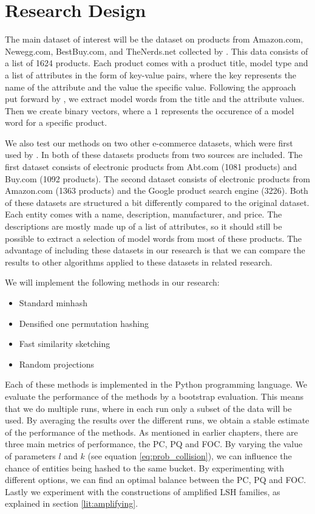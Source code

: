 \chapter{Research Design}
The main dataset of interest will be the dataset on products from Amazon.com, Newegg.com, BestBuy.com, and TheNerds.net collected by \cite{DamGKNVF16}. This data consists of a list of 1624 products. Each product comes with a product title, model type and a list of attributes in the form of key-value pairs, where the key represents the name of the attribute and the value the specific value. Following the approach put forward by \cite{HartveldKMNPFS18}, we extract model words from the title and the attribute values. Then we create binary vectors, where a $1$ represents the occurence of a model word for a specific product.

We also test our methods on two other e-commerce datasets, which were first used by \cite{KopckeTR10}. In both of these datasets products from two sources are included. The first dataset consists of electronic products from Abt.com (1081 products) and Buy.com (1092 products). The second dataset consists of electronic products from Amazon.com (1363 products) and the Google product search engine (3226). Both of these datasets are structured a bit differently compared to the original dataset. Each entity comes with a name, description, manufacturer, and price. The descriptions are mostly made up of a list of attributes, so it should still be possible to extract a selection of model words from most of these products. The advantage of including these datasets in our research is that we can compare the results to other algorithms applied to these datasets in related research.

We will implement the following methods in our research:
\begin{itemize}
\item Standard minhash
\item Densified one permutation hashing
\item Fast similarity sketching
\item Random projections
\end{itemize}
Each of these methods is implemented in the Python programming language. We evaluate the performance of the methods by a bootstrap evaluation. This means that we do multiple runs, where in each run only a subset of the data will be used. By averaging the results over the different runs, we obtain a stable estimate of the performance of the methods. As mentioned in earlier chapters, there are three main metrics of performance, the PC, PQ and FOC. By varying the value of parameters $l$ and $k$ (see equation \ref{eq:prob_collision}), we can influence the chance of entities being hashed to the same bucket. By experimenting with different options, we can find an optimal balance between the PC, PQ and FOC. \newline
Lastly we  experiment with the constructions of amplified LSH families, as explained in section \ref{lit:amplifying}. 